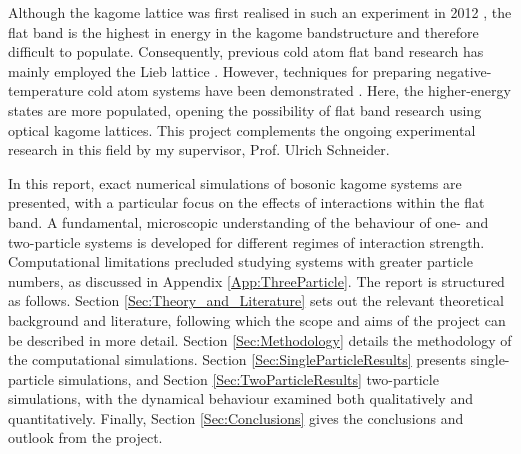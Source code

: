 Although the kagome lattice was first realised in such an experiment in 2012 \cite{Jo}, the flat band is the highest in energy in the kagome bandstructure and therefore difficult to populate. Consequently, previous cold atom flat band research has mainly employed the Lieb lattice \cite{Leykam}. However, techniques for preparing negative-temperature cold atom systems have been demonstrated \cite{Schneider13}. Here, the higher-energy states are more populated, opening the possibility of flat band research using optical kagome lattices. This project complements the ongoing experimental research in this field by my supervisor, Prof. Ulrich Schneider.

In this report, exact numerical simulations of bosonic kagome systems are presented, with a particular focus on the effects of interactions within the flat band. A fundamental, microscopic understanding of the behaviour of one- and two-particle systems is developed for different regimes of interaction strength. Computational limitations precluded studying systems with greater particle numbers, as discussed in Appendix \ref{App:ThreeParticle}. The report is structured as follows. Section \ref{Sec:Theory_and_Literature} sets out the relevant theoretical background and literature, following which the scope and aims of the project can be described in more detail. Section \ref{Sec:Methodology} details the methodology of the computational simulations. Section \ref{Sec:SingleParticleResults} presents single-particle simulations, and Section \ref{Sec:TwoParticleResults} two-particle simulations, with the dynamical behaviour examined both qualitatively and quantitatively. Finally, Section \ref{Sec:Conclusions} gives the conclusions and outlook from the project.
